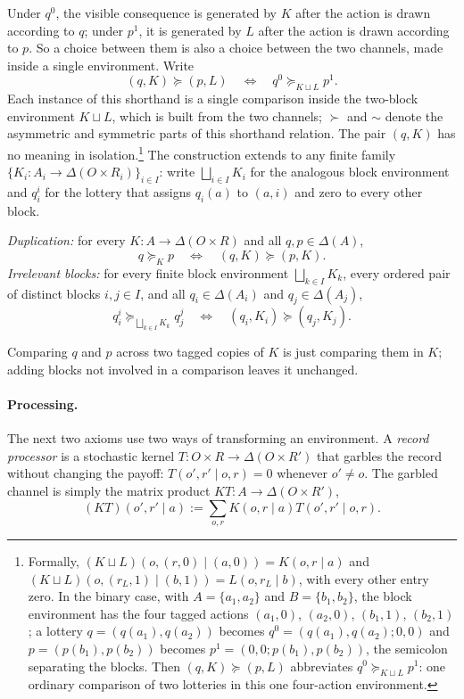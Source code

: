 \documentclass[11pt,a4paper]{article}
\theoremstyle{definition}
\newcommand{\D}{\Delta}
\newcommand{\1}{\mathbf 1}
\begin{document}
Under \(q^0\), the visible consequence is generated by \(K\) after the action is drawn according to \(q\); under \(p^1\), it is generated by \(L\) after the action is drawn according to \(p\). So a choice between them is
also a choice between the two channels, made inside a single environment.
Write
\[
 (q,K)\succeq(p,L)
 \quad\Longleftrightarrow\quad
 q^0\succeq_{K\sqcup L}p^1.
\]
Each instance of this shorthand is a single comparison inside the two-block environment $K\sqcup L$, which is
built from the two channels; $\succ$ and $\sim$ denote the asymmetric and symmetric parts of this shorthand
relation.  The pair $(q,K)$
has no meaning in isolation.\footnote{Formally, $(K\sqcup L)(o,(r,0)\mid(a,0))=K(o,r\mid a)$ and
$(K\sqcup L)(o,(r_L,1)\mid(b,1))=L(o,r_L\mid b)$, with every other entry zero.  In the binary case, with
$A=\{a_1,a_2\}$ and $B=\{b_1,b_2\}$, the block environment has the four tagged actions $(a_1,0)$, $(a_2,0)$,
$(b_1,1)$, $(b_2,1)$; a lottery $q=(q(a_1),q(a_2))$ becomes $q^0=(q(a_1),q(a_2);0,0)$ and $p=(p(b_1),p(b_2))$
becomes $p^1=(0,0;p(b_1),p(b_2))$, the semicolon separating the blocks.  Then $(q,K)\succeq(p,L)$ abbreviates
$q^0\succeq_{K\sqcup L}p^1$: one ordinary comparison of two lotteries in this one four-action environment.}  The construction extends to any finite family
$\{K_i:A_i\to\D(O\times R_i)\}_{i\in I}$: write $\bigsqcup_{i\in I}K_i$ for the analogous block environment and
$q_i^i$ for the lottery that assigns $q_i(a)$ to $(a,i)$ and zero to every other block.

\begin{description}[leftmargin=*,style=sameline]

\item[(A5) Block-comparison coherence.]
\emph{Duplication:} for every $K:A\to\D(O\times R)$ and all $q,p\in\D(A)$,
\[
 q\succeq_Kp
 \quad\Longleftrightarrow\quad
 (q,K)\succeq(p,K).
\]
\emph{Irrelevant blocks:} for every finite block environment $\bigsqcup_{k\in I}K_k$, every ordered pair of
distinct blocks $i,j\in I$, and all $q_i\in\D(A_i)$ and $q_j\in\D(A_j)$,
\[
 q_i^i\succeq_{\bigsqcup_{k\in I}K_k}q_j^j
 \quad\Longleftrightarrow\quad
 (q_i,K_i)\succeq(q_j,K_j).
\]

Comparing $q$ and $p$ across two tagged copies of $K$ is just comparing them in $K$; adding blocks not involved
in a comparison leaves it unchanged.

\end{description}

\paragraph{Processing.}
The next two axioms use two ways of transforming an environment.  A \emph{record processor} is a stochastic
kernel $T:O\times R\to\D(O\times R')$ that garbles the record without changing the payoff:
$T(o',r'\mid o,r)=0$ whenever $o'\neq o$.  The garbled channel is simply the matrix product
$KT:A\to\D(O\times R')$,
\begin{equation}
 (KT)(o',r'\mid a)
 :=\sum_{o,r}K(o,r\mid a)T(o',r'\mid o,r).
 \label{eq:record-processing}
\end{equation}
\end{document}
